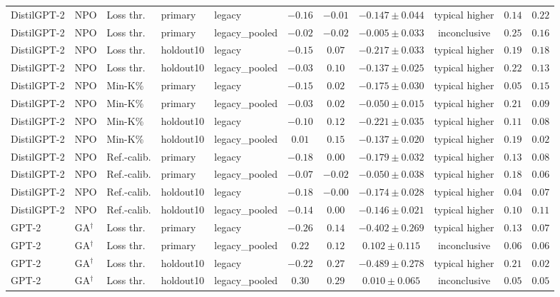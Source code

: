 {\begin{longtable}{@{\extracolsep{\fill}}lllllcccccc@{}}
DistilGPT-2 & NPO & Loss thr. & primary & legacy & $-0.16$ & $-0.01$ & $-0.147 \pm 0.044$ & typical higher & $0.14$ & $0.22$ \\
DistilGPT-2 & NPO & Loss thr. & primary & legacy\_pooled & $-0.02$ & $-0.02$ & $-0.005 \pm 0.033$ & inconclusive & $0.25$ & $0.16$ \\
DistilGPT-2 & NPO & Loss thr. & holdout10 & legacy & $-0.15$ & $0.07$ & $-0.217 \pm 0.033$ & typical higher & $0.19$ & $0.18$ \\
DistilGPT-2 & NPO & Loss thr. & holdout10 & legacy\_pooled & $-0.03$ & $0.10$ & $-0.137 \pm 0.025$ & typical higher & $0.22$ & $0.13$ \\
DistilGPT-2 & NPO & Min-K\% & primary & legacy & $-0.15$ & $0.02$ & $-0.175 \pm 0.030$ & typical higher & $0.05$ & $0.15$ \\
DistilGPT-2 & NPO & Min-K\% & primary & legacy\_pooled & $-0.03$ & $0.02$ & $-0.050 \pm 0.015$ & typical higher & $0.21$ & $0.09$ \\
DistilGPT-2 & NPO & Min-K\% & holdout10 & legacy & $-0.10$ & $0.12$ & $-0.221 \pm 0.035$ & typical higher & $0.11$ & $0.08$ \\
DistilGPT-2 & NPO & Min-K\% & holdout10 & legacy\_pooled & $0.01$ & $0.15$ & $-0.137 \pm 0.020$ & typical higher & $0.19$ & $0.02$ \\
DistilGPT-2 & NPO & Ref.-calib. & primary & legacy & $-0.18$ & $0.00$ & $-0.179 \pm 0.032$ & typical higher & $0.13$ & $0.08$ \\
DistilGPT-2 & NPO & Ref.-calib. & primary & legacy\_pooled & $-0.07$ & $-0.02$ & $-0.050 \pm 0.038$ & typical higher & $0.18$ & $0.06$ \\
DistilGPT-2 & NPO & Ref.-calib. & holdout10 & legacy & $-0.18$ & $-0.00$ & $-0.174 \pm 0.028$ & typical higher & $0.04$ & $0.07$ \\
DistilGPT-2 & NPO & Ref.-calib. & holdout10 & legacy\_pooled & $-0.14$ & $0.00$ & $-0.146 \pm 0.021$ & typical higher & $0.10$ & $0.11$ \\
GPT-2 & GA$^{\dagger}$ & Loss thr. & primary & legacy & $-0.26$ & $0.14$ & $-0.402 \pm 0.269$ & typical higher & $0.13$ & $0.07$ \\
GPT-2 & GA$^{\dagger}$ & Loss thr. & primary & legacy\_pooled & $0.22$ & $0.12$ & $0.102 \pm 0.115$ & inconclusive & $0.06$ & $0.06$ \\
GPT-2 & GA$^{\dagger}$ & Loss thr. & holdout10 & legacy & $-0.22$ & $0.27$ & $-0.489 \pm 0.278$ & typical higher & $0.21$ & $0.02$ \\
GPT-2 & GA$^{\dagger}$ & Loss thr. & holdout10 & legacy\_pooled & $0.30$ & $0.29$ & $0.010 \pm 0.065$ & inconclusive & $0.05$ & $0.05$ \\

\end{longtable}}
